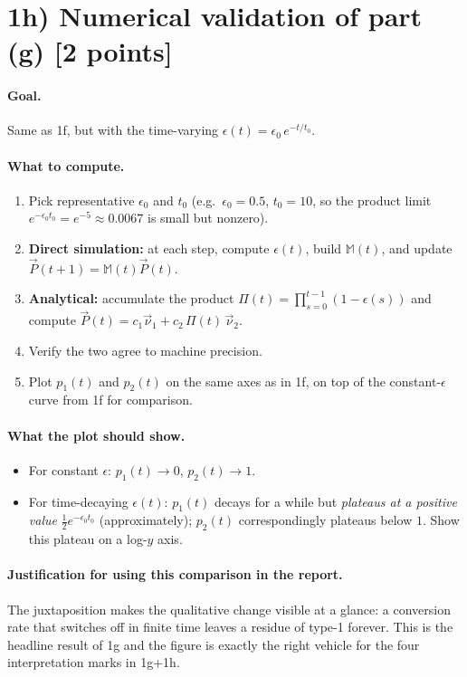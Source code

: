 \documentclass[12pt,a4paper]{article}
\newcommand{\M}{\mathbb{M}}
\newcommand{\vnu}{\vec{\nu}}
\newcommand{\vP}{\vec{P}}
\begin{document}
\section*{1h) Numerical validation of part (g) [2 points]}

\paragraph{Goal.} Same as 1f, but with the time-varying $\epsilon(t) = \epsilon_0\,e^{-t/t_0}$.

\paragraph{What to compute.}
\begin{enumerate}[label=(\arabic*),leftmargin=*]
    \item Pick representative $\epsilon_0$ and $t_0$ (e.g.~$\epsilon_0 = 0.5$, $t_0 = 10$, so the product limit $e^{-\epsilon_0 t_0} = e^{-5} \approx 0.0067$ is small but nonzero).
    \item \textbf{Direct simulation:} at each step, compute $\epsilon(t)$, build $\M(t)$, and update $\vP(t+1) = \M(t)\vP(t)$.
    \item \textbf{Analytical:} accumulate the product $\Pi(t) = \prod_{s=0}^{t-1}(1-\epsilon(s))$ and compute $\vP(t) = c_1\vnu_1 + c_2\,\Pi(t)\,\vnu_2$.
    \item Verify the two agree to machine precision.
    \item Plot $p_1(t)$ and $p_2(t)$ on the same axes as in 1f, on top of the constant-$\epsilon$ curve from 1f for comparison.
\end{enumerate}

\paragraph{What the plot should show.}
\begin{itemize}[leftmargin=*]
    \item For constant $\epsilon$: $p_1(t) \to 0$, $p_2(t) \to 1$.
    \item For time-decaying $\epsilon(t)$: $p_1(t)$ decays for a while but \emph{plateaus at a positive value} $\tfrac{1}{2}e^{-\epsilon_0 t_0}$ (approximately); $p_2(t)$ correspondingly plateaus below $1$. Show this plateau on a log-$y$ axis.
\end{itemize}

\paragraph{Justification for using this comparison in the report.} The juxtaposition makes the qualitative change visible at a glance: a conversion rate that switches off in finite time leaves a residue of type-1 forever. This is the headline result of 1g and the figure is exactly the right vehicle for the four interpretation marks in 1g+1h.
\end{document}
